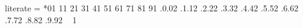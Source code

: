 {    %
    literate          =
        *{0}{{{}}}{1}
        {1}{{{}}}{1}
        {2}{{{}}}{1}
        {3}{{{}}}{1}
        {4}{{{}}}{1}
        {5}{{{}}}{1}
        {6}{{{}}}{1}
        {7}{{{}}}{1}
        {8}{{{}}}{1}
        {9}{{{}}}{1}
        {.0}{{{\codeNumericsStyle.0}}}{2}
        {.1}{{{\codeNumericsStyle.1}}}{2}
        {.2}{{{\codeNumericsStyle.2}}}{2}
        {.3}{{{\codeNumericsStyle.3}}}{2}
        {.4}{{{\codeNumericsStyle.4}}}{2}
        {.5}{{{\codeNumericsStyle.5}}}{2}
        {.6}{{{\codeNumericsStyle.6}}}{2}
        {.7}{{{\codeNumericsStyle.7}}}{2}
        {.8}{{{\codeNumericsStyle.8}}}{2}
        {.9}{{{\codeNumericsStyle.9}}}{2}
        {\ }{{ }}{1}
}


\newenvironment{tablehtbp}{
    \begin{table}[htbp]
        \centering
        \scriptsize}{
    \end{table}}
